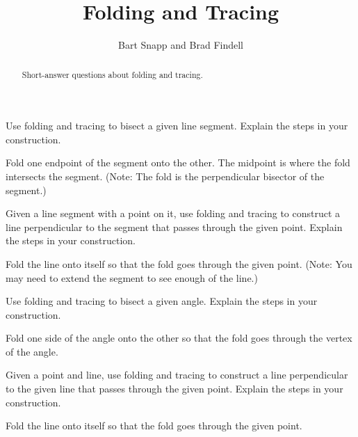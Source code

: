 \documentclass[nooutcomes]{ximera}
\title{Folding and Tracing}
\author{Bart Snapp and Brad Findell}
\begin{document}
\begin{abstract}
Short-answer questions about folding and tracing. 
\end{abstract}
\maketitle

%

\begin{problem}
Use folding and tracing to bisect a given line segment. Explain the steps in
  your construction.
\begin{hint}
Fold one endpoint of the segment onto the other.  The midpoint is where the fold intersects the segment.  (Note: The fold is the perpendicular bisector of the segment.)
\end{hint}
\end{problem}

\begin{problem}
Given a line segment with a point on it, use folding and tracing to
  construct a line perpendicular to the segment that passes through
  the given point. Explain the steps in your construction.
\begin{hint}
Fold the line onto itself so that the fold goes through the given point.  (Note: You may need to extend the segment to see enough of the line.)
\end{hint}
\end{problem}

\begin{problem}
Use folding and tracing to bisect a given angle. Explain the steps in your
  construction.
\begin{hint}
Fold one side of the angle onto the other so that the fold goes through the vertex of the angle. 
\end{hint}
\end{problem}

\begin{problem}
Given a point and line, use folding and tracing to construct a line
  perpendicular to the given line that passes through the given
  point. Explain the steps in your construction.
\begin{hint}
Fold the line onto itself so that the fold goes through the given point. 
\end{hint}
\end{problem}
\end{document}
